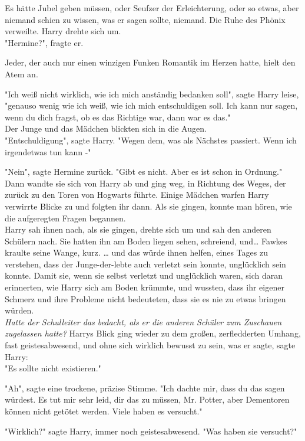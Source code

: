 {Es hätte Jubel geben müssen, oder Seufzer der Erleichterung, oder so etwas, aber niemand schien zu wissen, was er sagen sollte, niemand. Die Ruhe des Phönix verweilte. Harry drehte sich um.\\ "Hermine?", fragte er.

Jeder, der auch nur einen winzigen Funken Romantik im Herzen hatte, hielt den Atem an.

"Ich weiß nicht wirklich, wie ich mich anständig bedanken soll", sagte Harry leise, "genauso wenig wie ich weiß, wie ich mich entschuldigen soll. Ich kann nur sagen, wenn du dich fragst, ob es das Richtige war, dann war es das."\\ Der Junge und das Mädchen blickten sich in die Augen.\\ "Entschuldigung", sagte Harry. "Wegen dem, was als Nächstes passiert. Wenn ich irgendetwas tun kann -"

"Nein", sagte Hermine zurück. "Gibt es nicht. Aber es ist schon in Ordnung."\\ Dann wandte sie sich von Harry ab und ging weg, in Richtung des Weges, der zurück zu den Toren von Hogwarts führte. Einige Mädchen warfen Harry verwirrte Blicke zu und folgten ihr dann. Als sie gingen, konnte man hören, wie die aufgeregten Fragen begannen.\\ Harry sah ihnen nach, als sie gingen, drehte sich um und sah den anderen Schülern nach. Sie hatten ihn am Boden liegen sehen, schreiend, und… Fawkes kraulte seine Wange, kurz. … und das würde ihnen helfen, eines Tages zu verstehen, dass der Junge-der-lebte auch verletzt sein konnte, unglücklich sein konnte. Damit sie, wenn sie selbst verletzt und unglücklich waren, sich daran erinnerten, wie Harry sich am Boden krümmte, und wussten, dass ihr eigener Schmerz und ihre Probleme nicht bedeuteten, dass sie es nie zu etwas bringen würden.\\ \emph{\hfill\break Hatte der Schulleiter das bedacht, als er die anderen Schüler zum Zuschauen zugelassen hatte?} Harrys Blick ging wieder zu dem großen, zerfledderten Umhang, fast geistesabwesend, und ohne sich wirklich bewusst zu sein, was er sagte, sagte Harry:\\ "Es sollte nicht existieren."

"Ah", sagte eine trockene, präzise Stimme. "Ich dachte mir, dass du das sagen würdest. Es tut mir sehr leid, dir das zu müssen, Mr. Potter, aber Dementoren können nicht getötet werden. Viele haben es versucht."

"Wirklich?" sagte Harry, immer noch geistesabwesend. "Was haben sie versucht?"

}
